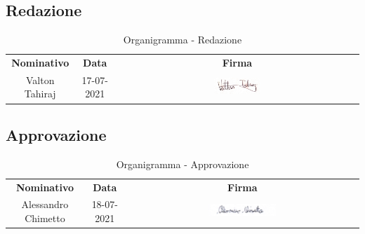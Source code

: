 
\subsection{Redazione}

\begin{table} [h!]
	\begin{center}
		\renewcommand{\arraystretch}{3}
		\begin{tabular} { c c c }
			\rowcolor{lightgray}
			\textbf{Nominativo} & \textbf{Data} & \textbf{Firma} \\
			Valton Tahiraj & 17-07-2021 & \includegraphics[width=0.2\textwidth]{res/img/firme/valton_tahiraj.jpg}\\
		\end{tabular}
		\caption{Organigramma - Redazione}
	\end{center}
\end{table}


\subsection{Approvazione}

\begin{table} [h!]
	\begin{center}
		\renewcommand{\arraystretch}{3}
		\begin{tabular} { c c c }
			\rowcolor{lightgray}
			\textbf{Nominativo} & \textbf{Data} & \textbf{Firma} \\
			Alessandro Chimetto & 18-07-2021 & \includegraphics[width=0.3\textwidth]{res/img/firme/alessandro_chimetto.jpg}\\
		\end{tabular}
		\caption{Organigramma - Approvazione}
	\end{center}
\end{table}

\newpage

